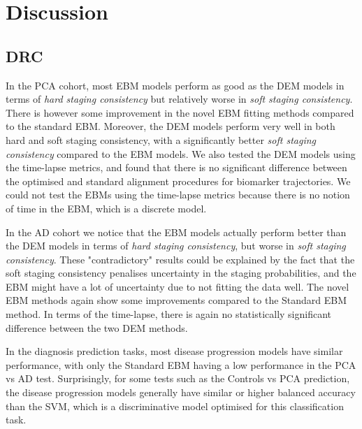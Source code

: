 
\section{Discussion}
\label{sec:perfDiscussion}

\subsection{DRC}
\label{sec:perfDRCdiscussion}

In the PCA cohort, most EBM models perform as good as the DEM models in terms of \emph{hard staging consistency} but relatively worse in \emph{soft staging consistency}. There is however some improvement in the novel EBM fitting methods compared to the standard EBM. Moreover, the DEM models perform very well in both hard and soft staging consistency, with a significantly better \emph{soft staging consistency} compared to the EBM models. We also tested the DEM models using the time-lapse metrics, and found that there is no significant difference between the optimised and standard alignment procedures for biomarker trajectories. We could not test the EBMs using the time-lapse metrics because there is no notion of time in the EBM, which is a discrete model. 

In the AD cohort we notice that the EBM models actually perform better than the DEM models in terms of \emph{hard staging consistency}, but worse in \emph{soft staging consistency}. These "contradictory" results could be explained by the fact that the soft staging consistency penalises uncertainty in the staging probabilities, and the EBM might have a lot of uncertainty due to not fitting the data well. The novel EBM methods again show some improvements compared to the Standard EBM method. In terms of the time-lapse, there is again no statistically significant difference between the two DEM methods.

In the diagnosis prediction tasks, most disease progression models have similar performance, with only the Standard EBM having a low performance in the PCA vs AD test. Surprisingly, for some tests such as the Controls vs PCA prediction, the disease progression models generally have similar or higher balanced accuracy than the SVM, which is a discriminative model optimised for this classification task.  

